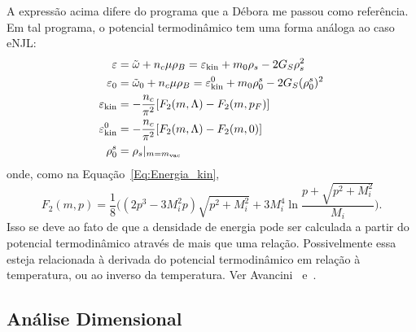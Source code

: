 A expressão acima difere do programa que a Débora me passou como referência. Em tal programa, o potencial termodinâmico tem uma forma análoga ao caso eNJL:
\begin{subequations}\label{Eq:Pot_termodinamico_2}
\begin{align}
	\varepsilon &= \tilde{\omega} + n_c\mu\rho_B = \varepsilon_{\rm{kin}} + m_0\rho_s - 2G_S\rho_s^2 \\
	\varepsilon_0 &= \tilde{\omega}_0 + n_c\mu\rho_B = \varepsilon_{\rm{kin}}^0 + m_0\rho_0^s - 2G_S(\rho_0^s)^2 \\
	\varepsilon_{\rm{kin}} &= -\frac{n_c}{\pi^2} [F_2(m, \Lambda) - F_2(m, p_F)] \\
	\varepsilon_{\rm{kin}}^0 &= -\frac{n_c}{\pi^2} [F_2(m, \Lambda) - F_2(m, 0)] \\
	\rho_0^s &= \rho_s|_{m = m_{\rm{vac}}}
\end{align}
\end{subequations}
%
onde, como na Equação~\eqref{Eq:Energia_kin},
\begin{equation}
	F_2(m, p) = \frac{1}{8}\Big((2p^3 - 3M_i^2p)\sqrt{p^2 + M_i^2} + 3M_i^4\ln\frac{p + \sqrt{p^2 + M_i^2}}{M_i}\Big).
\end{equation}
%
Isso se deve ao fato de que a densidade de energia pode ser calculada a partir do potencial termodinâmico através de mais que uma relação. Possivelmente essa esteja relacionada à derivada do potencial termodinâmico em relação à temperatura, ou ao inverso da temperatura. Ver Avancini~\cite{Avancini2004} e~\cite{Avancini2006}.

\subsection{Análise Dimensional}

